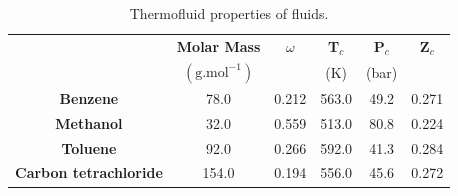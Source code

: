 \documentclass[12pts,a4paper,amsmath,amssymb,floatfix]{article}%
\begin{document}
\begin{enumerate}[label=\bfseries Problem \arabic*:]
\begin{table}[h]
\begin{center}
\begin{tabular}{||c | c c c c c ||} 
\hline\hline
                          & {\bf Molar Mass}           &  {\bf $\omega$}  & {\bf T$_{c}$}  & {\bf P$_{c}$} & {\bf Z$_{c}$}  \\
                          & $\left(\text{g.mol}^{-1}\right)$ &                  &   (K)         &   (bar)       &               \\ 
\hline
{\bf Benzene}             & 78.0                             &  0.212           &  563.0         &  49.2        &    0.271       \\  
{\bf Methanol}            & 32.0                             &  0.559           &  513.0         &  80.8        &    0.224       \\  
{\bf Toluene}             & 92.0                             &  0.266           &  592.0         &  41.3        &    0.284       \\  
{\bf Carbon tetrachloride}& 154.0                            &  0.194           &  556.0         &  45.6        &    0.272       \\  
\hline\hline
\end{tabular}
\caption{Thermofluid properties of fluids.}
\label{Practical1:Table1}
\end{center}
\end{table}


\end{enumerate}
\end{document}

